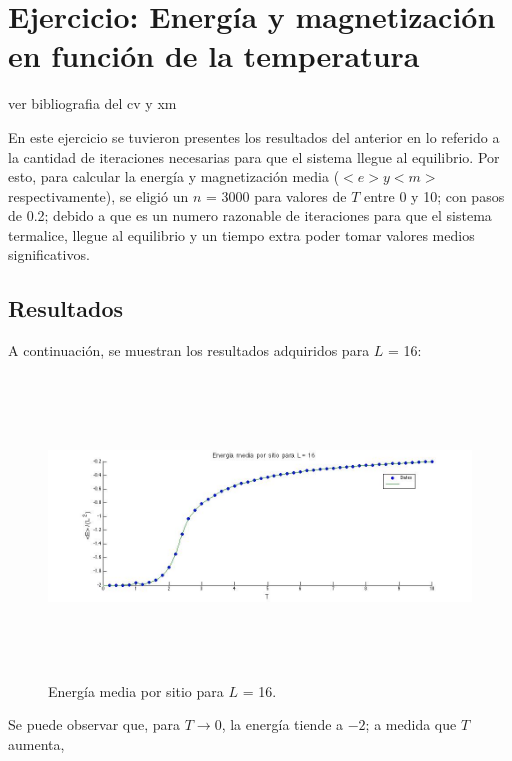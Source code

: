 \documentclass[a4paper,12pt]{article}
\begin{document}
\section{Ejercicio: Energ\'ia y magnetizaci\'on en funci\'on de la temperatura}

ver bibliografia del cv y xm

En este ejercicio se tuvieron presentes los resultados del anterior en lo referido a la cantidad de iteraciones necesarias para que el sistema llegue al equilibrio. Por esto, para calcular la energ\'ia y magnetizaci\'on media ($<e> y <m>$ respectivamente), se eligi\'o un $n$ = 3000 para valores de $T$ entre 0 y 10; con pasos de 0.2; debido a que es un numero razonable de iteraciones para que el sistema termalice, llegue al equilibrio y un tiempo extra poder tomar valores medios significativos.

\subsection{Resultados}

A continuaci\'on, se muestran los resultados adquiridos para $L$ = 16:

\begin{figure}[H]
\begin{center}
\includegraphics[height=8cm]{../graficos/Emean_L16.jpg}
\caption[width=5cm]{Energ\'ia media por sitio para $L$ = 16.}
\end{center}
\end{figure}

Se puede observar que, para $T \rightarrow 0$, la energ\'ia tiende a $-2$; a medida que $T$ aumenta, 
\end{document}
